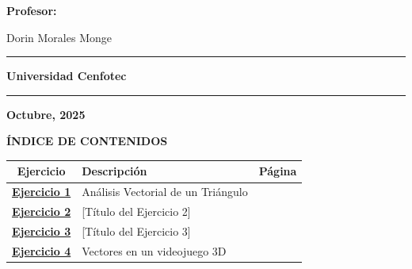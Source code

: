 \documentclass{article}
\begin{document}
\begin{titlepage}
\vspace{2cm}

{\large \textbf{\textcolor{cenfotecblue}{Profesor:}}}
\vspace{0.5cm}

{\large \textcolor{cenfotecgray}{Dorin Morales Monge}}

\vfill

\textcolor{cenfotecblue}{\rule{0.6\textwidth}{2pt}}

\vspace{0.5cm}

{\Large \textbf{\textcolor{cenfotecblue}{Universidad Cenfotec}}}

\vspace{0.3cm}

\textcolor{cenfotecgray}{\rule{0.4\textwidth}{1pt}}

\vspace{0.3cm}

{\large \textbf{Octubre, 2025}}

\vspace{0.5cm}

\end{titlepage}

\newpage

\begin{center}
{\Large \textbf{\textcolor{cenfotecblue}{ÍNDICE DE CONTENIDOS}}}
\end{center}

\vspace{1cm}

\begin{center}
\begin{tabular}{|c|p{8cm}|c|}
\hline
\rowcolor{cenfotecblue!20}
\textbf{Ejercicio} & \textbf{Descripción} & \textbf{Página} \\
\hline
\hyperlink{ejercicio1}{\textbf{Ejercicio 1}} & Análisis Vectorial de un Triángulo & \pageref{ejercicio1} \\
\hline
\hyperlink{ejercicio2}{\textbf{Ejercicio 2}} & [Título del Ejercicio 2] & \pageref{ejercicio2} \\
\hline
\hyperlink{ejercicio3}{\textbf{Ejercicio 3}} & [Título del Ejercicio 3] & \pageref{ejercicio3} \\
\hline
\hyperlink{ejercicio4}{\textbf{Ejercicio 4}} & Vectores en un videojuego 3D & \pageref{ejercicio4} \\
\hline
\end{tabular}
\end{center}
\end{document}
